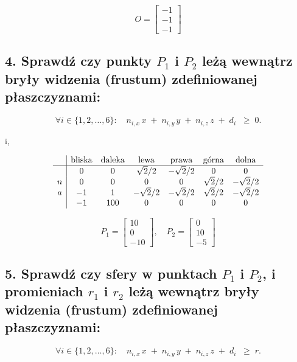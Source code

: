 \begin{enumerate}
    \[
    O = \begin{bmatrix} -1 \\ -1 \\ -1 \end{bmatrix}
    \]

\end{enumerate}
\subsection*{4. Sprawdź czy punkty \( P_1 \) i \( P_2 \) leżą wewnątrz bryły widzenia (frustum) zdefiniowanej płaszczyznami:}

\[
\forall i \in \{1,2,\dots,6\}
:\quad
n_{i,x}\,x \;+\; n_{i,y}\,y \;+\; n_{i,z}\,z \;+\; d_i \;\;\ge\; 0.
\]

i,

\[
\begin{array}{c|cccccc}
    & \text{bliska} & \text{daleka} & \text{lewa} & \text{prawa} & \text{górna} & \text{dolna} \\
    \hline
    & 0 & 0 & \sqrt{2}/2 & -\sqrt{2}/2 & 0 & 0 \\
    n & 0 & 0 & 0 & 0 & \sqrt{2}/2 & -\sqrt{2}/2 \\
    a & -1 & 1 & -\sqrt{2}/2 & -\sqrt{2}/2 & \sqrt{2}/2 & -\sqrt{2}/2 \\
    & -1 & 100 & 0 & 0 & 0 & 0 \\
\end{array}
\]

\[
P_1 = \begin{bmatrix} 10 \\ 0 \\ -10 \end{bmatrix}, \quad
P_2 = \begin{bmatrix} 0 \\ 10 \\ -5 \end{bmatrix}
\]


\subsection*{5. Sprawdź czy sfery w punktach \( P_1 \) i \( P_2 \), i promieniach \( r_1 \) i \( r_2 \) leżą wewnątrz bryły widzenia (frustum) zdefiniowanej płaszczyznami:}

\[
\forall i \in \{1,2,\dots,6\}
:\quad
n_{i,x}\,x \;+\; n_{i,y}\,y \;+\; n_{i,z}\,z \;+\; d_i \;\;\ge\; r.
\]


